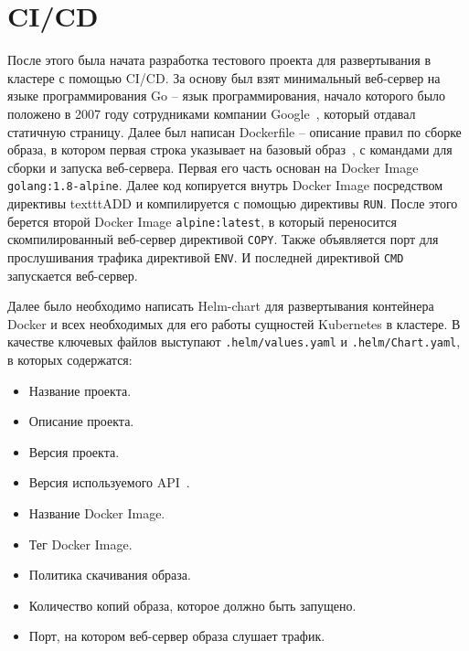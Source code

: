 \section{CI/CD}
\label{sec:ci-cd}

После этого была начата разработка тестового проекта для развертывания в кластере с помощью CI/CD. За основу был взят минимальный веб-сервер на языке программирования Go -- язык программирования, начало которого было положено в 2007 году сотрудниками компании Google~\cite{def:go},
который отдавал статичную страницу. Далее был написан Dockerfile -- описание правил по сборке образа, в котором первая строка указывает на базовый образ~\cite{def:docker},
с командами для сборки и запуска веб-сервера. Первая его часть основан на Docker Image
\texttt{golang:1.8-alpine}. Далее код копируется внутрь Docker Image посредством директивы texttt{ADD} и компилируется с помощью директивы \texttt{RUN}. После этого берется второй Docker Image \texttt{alpine:latest}, в который переносится скомпилированный веб-сервер директивой \texttt{COPY}. Также объявляется порт для прослушивания трафика директивой \texttt{ENV}. И последней директивой \texttt{CMD} запускается веб-сервер.

Далее было необходимо написать Helm-chart для развертывания контейнера Docker и всех необходимых для его работы сущностей Kubernetes в кластере. В качестве ключевых файлов выступают \texttt{.helm/values.yaml} и \texttt{.helm/Chart.yaml}, в которых содержатся:

\begin{itemize}
    \item Название проекта.
    \item Описание проекта.
    \item Версия проекта.
    \item Версия используемого API~\cite{def:api}.
    \item Название Docker Image.
    \item Тег Docker Image.
    \item Политика скачивания образа.
    \item Количество копий образа, которое должно быть запущено.
    \item Порт, на котором веб-сервер образа слушает трафик.
\end{itemize}

